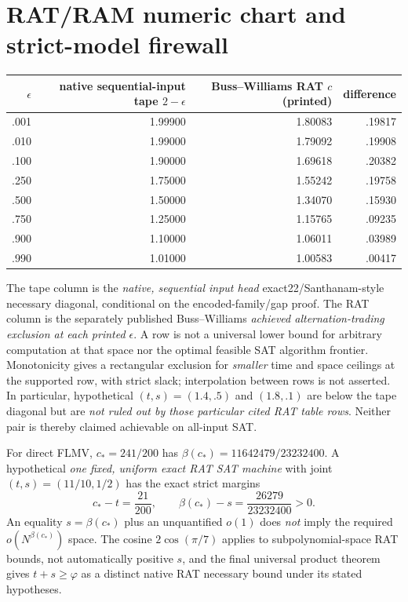 \documentclass[11pt]{article}
\begin{document}
\section{RAT/RAM numeric chart and strict-model firewall}
\begin{center}\begin{tabular}{rrrr}\toprule
$\epsilon$ & native sequential-input tape $2-\epsilon$ & Buss--Williams RAT $c$ (printed) & difference \\\midrule
.001&1.99900&1.80083&.19817\\
.010&1.99000&1.79092&.19908\\
.100&1.90000&1.69618&.20382\\
.250&1.75000&1.55242&.19758\\
.500&1.50000&1.34070&.15930\\
.750&1.25000&1.15765&.09235\\
.900&1.10000&1.06011&.03989\\
.990&1.01000&1.00583&.00417\\
\bottomrule\end{tabular}\end{center}
The tape column is the \emph{native, sequential input head} exact22/Santhanam-style necessary diagonal, conditional on the encoded-family/gap proof. The RAT column is the separately published Buss--Williams \emph{achieved alternation-trading exclusion at each printed $\epsilon$}. A row is not a universal lower bound for arbitrary computation at that space nor the optimal feasible SAT algorithm frontier. Monotonicity gives a rectangular exclusion for \emph{smaller} time and space ceilings at the supported row, with strict slack; interpolation between rows is not asserted. In particular, hypothetical $(t,s)=(1.4,.5)$ and $(1.8,.1)$ are below the tape diagonal but are \emph{not ruled out by those particular cited RAT table rows}. Neither pair is thereby claimed achievable on all-input SAT.

For direct FLMV, $c_*=241/200$ has $\beta(c_*)=11642479/23232400$. A hypothetical \emph{one fixed, uniform exact RAT SAT machine} with joint $(t,s)=(11/10,1/2)$ has the exact strict margins
\[
c_*-t=\frac{21}{200},\qquad \beta(c_*)-s=\frac{26279}{23232400}>0.\tag{4}
\]
An equality $s=\beta(c_*)$ plus an unquantified $o(1)$ does \emph{not} imply the required $o(N^{\beta(c_*)})$ space. The cosine $2\cos(\pi/7)$ applies to subpolynomial-space RAT bounds, not automatically positive $s$, and the final universal product theorem gives $t+s\ge\varphi$ as a distinct native RAT necessary bound under its stated hypotheses.
\end{document}
